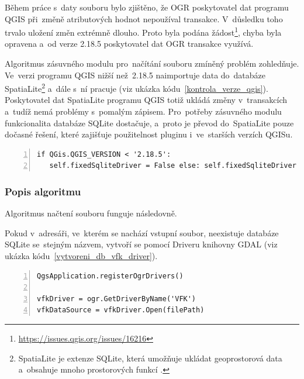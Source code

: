 Během práce s~daty souboru  bylo zjištěno, že OGR poskytovatel
dat programu QGIS při~změně atributových hodnot nepoužíval
transakce. V~důsledku toho trvalo uložení změn extrémně dlouho. Proto
byla podána
žádost\footnote{\url{https://issues.qgis.org/issues/16216}}, chyba
byla opravena a~od verze 2.18.5 poskytovatel dat OGR transakce
využívá.

Algoritmus zásuvného modulu pro~načítání  souboru zmíněný
problém zo\-hledňuje. Ve~verzi programu QGIS nižší než~2.18.5
naimportuje data do~databáze SpatiaLite\footnote{SpatiaLite je extenze
SQLite, která umožňuje ukládat geoprostorová data a~obsahuje mnoho
prostorových funkcí \citep{spatialite} \citep{wiki_spatialite}.}
a~dále s~ní pracuje (viz ukázka
kódu~\ref{kontrola_verze_qgis}). Poskytovatel dat SpatiaLite programu
QGIS totiž ukládá změny v~transakcích a~tudíž nemá problémy s~pomalým
zápisem. Pro~potřeby zásuvného modulu funkcionalita databáze SQLite
dostačuje, a~proto je převod do~SpatiaLite pouze dočasné řešení, které
zajišťuje použitelnost pluginu i~ve~starších verzích QGISu.

{\scriptsize
\begin{lstlisting}[style=python, caption={Kontrola verze programu
QGIS}, captionpos=b, label=kontrola_verze_qgis, backgroundcolor =
\color{light-gray}, numbers=left]
if QGis.QGIS_VERSION < '2.18.5':
   self.fixedSqliteDriver = False else: self.fixedSqliteDriver = True
\end{lstlisting}}

\subsubsection{Popis algoritmu}
\label{popis_algoritmu_nacteni_vfk}

Algoritmus načtení  souboru funguje následovně.

Pokud v~adresáři, ve~kterém se nachází vstupní  soubor,
neexistuje databáze SQLite se~stejným názvem, vytvoří se pomocí
 Driveru knihovny GDAL (viz ukázka
kódu~\ref{vytvoreni_db_vfk_driver}).

{\scriptsize
\begin{lstlisting}[style=python, caption={Vytvoření SQLite databáze
pomocí VFK Driveru}, captionpos=b, label=vytvoreni_db_vfk_driver,
backgroundcolor = \color{light-gray}, numbers=left]
QgsApplication.registerOgrDrivers()

vfkDriver = ogr.GetDriverByName('VFK')
vfkDataSource = vfkDriver.Open(filePath)
\end{lstlisting}}

